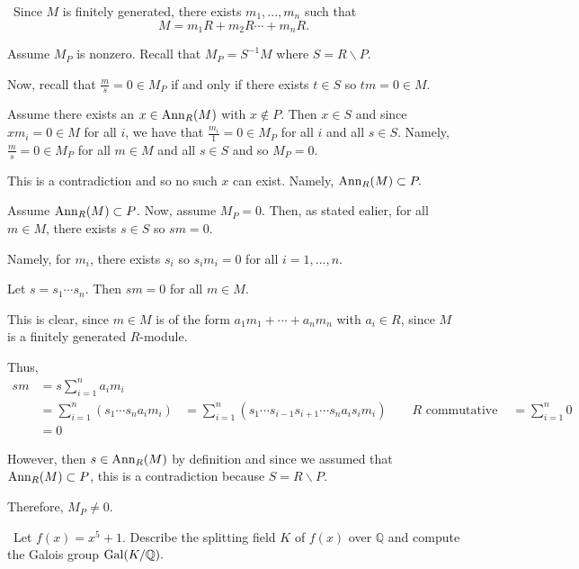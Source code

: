 \documentclass[12pt]{AlgebraQual}
\begin{document}
\begin{solution}$\,$
Since $M$ is finitely generated, there exists $m_1,...,m_n$ such that $$M=m_1R+m_2R\cdots+m_nR.$$

\boxed{\implies} Assume $M_P$ is nonzero. Recall that $M_P=S^{-1}M$ where $S=R\backslash P$.

Now, recall that $\frac{m}{s}=0\in M_P$ if and only if there exists $t\in S$ so $tm=0\in M$.

Assume there exists an $x\in\text{Ann}_R(M)$ with $x\notin P$. Then $x\in S$ and since $xm_i=0\in M$ for all $i$, we have that $\frac{m_i}{1}=0\in M_P$ for all $i$ and all $s\in S$. Namely, $\frac{m}{s}=0\in M_P$ for all $m\in M$ and all $s\in S$ and so $M_P=0$.

This is a contradiction and so no such $x$ can exist. Namely, $\text{Ann}_R(M)\subset P.$

\boxed{\impliedby} Assume $\text{Ann}_R(M)\subset P$. Now, assume $M_P=0$. Then, as stated ealier, for all $m\in M$, there exists $s\in S$ so $sm=0$.

Namely, for $m_i$, there exists $s_i$ so $s_im_i=0$ for all $i=1,...,n$.

Let $s=s_1\cdots s_n$. Then $sm=0$ for all $m\in M$.

This is clear, since $m\in M$ is of the form $a_1m_1+\cdots+a_nm_n$ with $a_i\in R$, since $M$ is a finitely generated $R$-module.

Thus, \begin{align*}
    sm&=s\sum_{i=1}^na_im_i\\
    &=\sum_{i=1}^n(s_1\cdots s_na_im_i)
    &=\sum_{i=1}^n(s_1\cdots s_{i-1}s_{i+1}\cdots s_na_is_im_i)\qquad R\text{ commutative }
    &=\sum_{i=1}^n0\\
    &=0
\end{align*}

However, then $s\in \text{Ann}_R(M)$ by definition and since we assumed that $\text{Ann}_R(M)\subset P$, this is a contradiction because $S=R\backslash P$.

Therefore, $M_P\not=0$.

\end{solution}
\newpage



\begin{problem} $\,$
Let $f(x)=x^5+1$. Describe the splitting field $K$ of $f(x)$ over $\mathbb{Q}$ and compute the Galois group $\text{Gal}(K/\mathbb{Q}).$
\end{problem}
\end{document}
